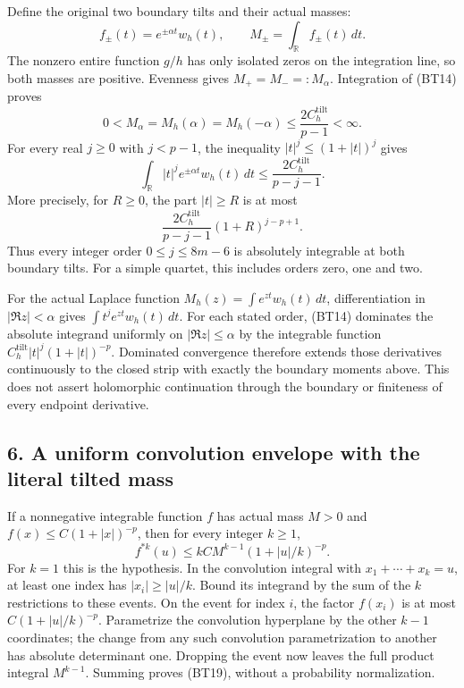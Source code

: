 Define the original two boundary tilts and their actual masses: \[
f_\pm(t)=e^{\pm\alpha t}w_h(t),\qquad
M_\pm=\int_{\mathbb R}f_\pm(t)\,dt.
\tag{BT15}
\] The nonzero entire function \(g/h\) has only isolated zeros on the integration line, so both masses are positive. Evenness gives \(M_+=M_-=:M_\alpha\). Integration of (BT14) proves \[
\boxed{
0<M_\alpha=M_h(\alpha)=M_h(-\alpha)
\le\frac{2C_h^{\mathrm{tilt}}}{p-1}<\infty.}
\tag{BT16}
\] For every real \(j\ge0\) with \(j<p-1\), the inequality \(|t|^j\le(1+|t|)^j\) gives \[
\int_{\mathbb R}|t|^j e^{\pm\alpha t}w_h(t)\,dt
\le\frac{2C_h^{\mathrm{tilt}}}{p-j-1}.
\tag{BT17}
\] More precisely, for \(R\ge0\), the part \(|t|\ge R\) is at most \[
\frac{2C_h^{\mathrm{tilt}}}{p-j-1}
(1+R)^{j-p+1}.
\tag{BT18}
\] Thus every integer order \(0\le j\le8m-6\) is absolutely integrable at both boundary tilts. For a simple quartet, this includes orders zero, one and two.

For the actual Laplace function \(M_h(z)=\int e^{zt}w_h(t)\,dt\), differentiation in \(|\Re z|<\alpha\) gives \(\int t^j e^{zt}w_h(t)\,dt\). For each stated order, (BT14) dominates the absolute integrand uniformly on \(|\Re z|\le\alpha\) by the integrable function \(C_h^{\mathrm{tilt}}|t|^j(1+|t|)^{-p}\). Dominated convergence therefore extends those derivatives continuously to the closed strip with exactly the boundary moments above. This does not assert holomorphic continuation through the boundary or finiteness of every endpoint derivative.

\subsection{6. A uniform convolution envelope with the literal tilted mass}\label{bt:a-uniform-convolution-envelope-with-the-literal-tilted-mass}

If a nonnegative integrable function \(f\) has actual mass \(M>0\) and \(f(x)\le C(1+|x|)^{-p}\), then for every integer \(k\ge1\), \[
\boxed{
f^{*k}(u)\le kCM^{k-1}(1+|u|/k)^{-p}.}
\tag{BT19}
\] For \(k=1\) this is the hypothesis. In the convolution integral with \(x_1+\cdots+x_k=u\), at least one index has \(|x_i|\ge|u|/k\). Bound its integrand by the sum of the \(k\) restrictions to these events. On the event for index \(i\), the factor \(f(x_i)\) is at most \(C(1+|u|/k)^{-p}\). Parametrize the convolution hyperplane by the other \(k-1\) coordinates; the change from any such convolution parametrization to another has absolute determinant one. Dropping the event now leaves the full product integral \(M^{k-1}\). Summing proves (BT19), without a probability normalization.

